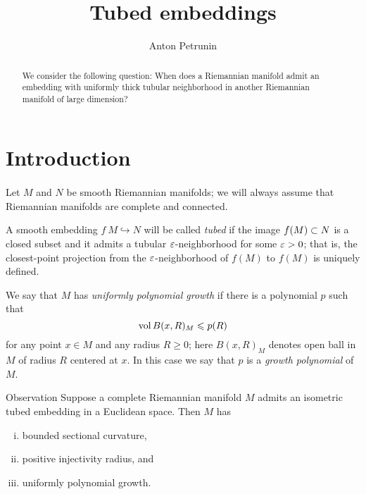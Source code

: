 \documentclass[a4paper,10pt]{article}
\def\thetitle{Tubed embeddings}
\def\theauthors{Anton Petrunin}
\begin{document}


\title{\thetitle}
\author{\theauthors}
\date{}
\maketitle

\begin{abstract}
We consider the following question:
When does a Riemannian manifold admit an embedding with uniformly thick tubular neighborhood in another Riemannian manifold of large dimension?
\end{abstract}

\section*{Introduction}

\paragraph{}\label{par:Observation}
Let $M$ and $N$ be smooth Riemannian manifolds; we will always assume that Riemannian manifolds are complete and connected.

A smooth embedding $f\:M\hookrightarrow N$ will be called \emph{tubed} if the image $f(M)\z\subset N$ is a closed subset and it admits a tubular $\varepsilon$-neighborhood for some $\varepsilon>0$;
that is, the closest-point projection from the $\varepsilon$-neighborhood of $f(M)$ to $f(M)$ is uniquely defined.

We say that $M$ has \emph{uniformly polynomial growth} if there is a polynomial $p$ such that 
\[\operatorname{\rm vol} B(x,R)_M\leqslant p(R)\]
for any point $x\in M$ and any radius $R\ge 0$;
here $B(x,R)_M$ denotes open ball in $M$ of radius $R$ centered at $x$.
In this case we say that $p$ is a \emph{growth polynomial} of $M$.

\begin{thm}{Observation}
Suppose a complete Riemannian manifold $M$ admits an isometric tubed embedding in a Euclidean space.
Then $M$ has
\begin{enumerate}[(i)]
\item bounded sectional curvature,
\item positive injectivity radius, and
\item\label{uniformly polynomial growth} uniformly  polynomial growth.
\end{enumerate}
\end{thm}
\end{document}
